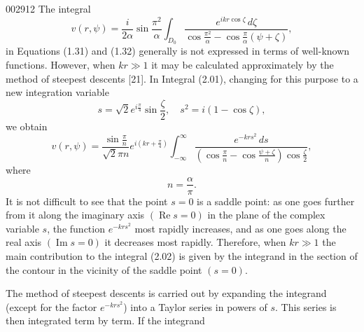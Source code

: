 \begin{scanpage}{0029}{12}
The integral
\[v(r,\psi)=\frac{i}{2\alpha}\sin\frac{\pi^2}{\alpha}\int_{D_0}\frac{e^{ikr\cos\zeta}\,d\zeta}{\cos\frac{\pi^2}{\alpha}-\cos\frac\pi\alpha(\psi+\zeta)},\tag{2.01}\]
in Equations (1.31) and (1.32) generally is not expressed in terms of well-known functions. However, when $kr\gg1$ it may be calculated approximately by the method of steepest descents [21]. In Integral (2.01), changing for this purpose to a new integration variable
\[s=\sqrt2e^{i\frac\pi4}\sin\frac\zeta2,\quad s^2=i(1-\cos\zeta),\]
we obtain
\[v(r,\psi)=\frac{\sin\frac\pi n}{\sqrt2\pi n}e^{i(kr+\frac\pi4)}\int_{-\infty}^{\infty}\frac{e^{-krs^2}\,ds}{\left(\cos\frac\pi n-\cos\frac{\psi+\zeta}{n}\right)\cos\frac\zeta2},\tag{2.02}\]
where
\[n=\frac\alpha\pi.\tag{2.03}\]
It is not difficult to see that the point $s=0$ is a saddle point: as one goes further from it along the imaginary axis $(\operatorname{Re}s=0)$ in the plane of the complex variable $s$, the function $e^{-krs^2}$ most rapidly increases, and as one goes along the real axis $(\operatorname{Im}s=0)$ it decreases most rapidly. Therefore, when $kr\gg1$ the main contribution to the integral (2.02) is given by the integrand in the section of the contour in the vicinity of the saddle point $(s=0)$.

The method of steepest descents is carried out by expanding the integrand (except for the factor $e^{-krs^2}$) into a Taylor series in powers of $s$. This series is then integrated term by term. If the integrand
\end{scanpage}
